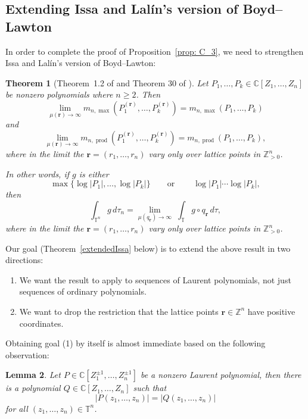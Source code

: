 \documentclass[12pt]{amsart}
\theoremstyle{plain}
\newtheorem{theorem}{Theorem}
\newtheorem{lemma}[theorem]{Lemma}
\theoremstyle{definition}
\theoremstyle{remark}
\numberwithin{theorem}{section}
\numberwithin{equation}{section} %
\newcommand{\CC}{\mathbb{C}}
\newcommand{\bZ}{{\mathbb{Z}}}
\newcommand{\bC}{{\mathbb{C}}}
\newcommand{\mb}{\mathbf}
\newcommand{\torus}{{\mathbb{T}}}
\begin{document}

\subsection{Extending Issa and Lal\'in's version of Boyd--Lawton} \label{extending_Issa}

In order to complete the proof of Proposition~\ref{prop: C_3}, we need to strengthen Issa and Lal\'in's version of Boyd--Lawton: %


\begin{theorem} [Theorem~1.2 of \cite{Issa2013} and Theorem 30 of \cite{LalinSinha}] \label{IssaThm}
Let $P_1, \dots, P_k \in \bC [Z_1, \ldots, Z_n]$ be nonzero polynomials where $n \ge 2$. Then
    \[\lim_{\mu\left( {\mb r} \right)  \to \infty} m_{n, \max}\left( P_1^{(\mb r)}, \ldots,  P_k^{(\mb r)}\right)
    =m_{n, \max}( P_1, \ldots,  P_k)
    \]
    and
    \[
    \lim_{\mu\left( {\mb r} \right)  \to \infty} m_{n, \operatorname{prod}}\left( P_1^{(\mb r)}, \ldots,  P_k^{(\mb r)}\right)
    =m_{n, \operatorname{prod}}(P_1, \ldots, P_k),
    \]
    where in the limit the $\mb r = (r_1, \ldots, r_n)$ vary only over lattice points in $\bZ^n_{>0}$.
    
        In other words, if $g$ is either
    $$
    \max \{ \log|P_1|, \ldots, \log|P_k| \}
    \qquad\text{or}\qquad
    \ \log|P_1| \cdots \log|P_k| ,
    $$
    then
    $$
\int_{\torus^n}  g \, d\tau_n= \lim_{\mu(q_\mb r)\to \infty}\;  \int_\torus g \circ q_{\mb r} \, d \tau,
$$
 where in the limit the $\mb r = (r_1, \ldots, r_n)$ vary only over lattice points in $\bZ^n_{>0}$.
\end{theorem}

Our goal (Theorem~\ref{extendedIssa} below) is to extend the above result in two directions: 
\begin{enumerate}
    \item We want the result to apply to sequences of Laurent polynomials, not just sequences of ordinary polynomials.

    \item We want to drop the restriction that the lattice points $\mb r \in \bZ^n$ have positive coordinates.
\end{enumerate} 


Obtaining goal (1) by itself is almost immediate based on the following observation:


\begin{lemma}\label{lem: PolyLaurSwap1}
    Let $P \in\CC\left[Z_1^{\pm1},\dots, Z_n^{\pm1}\right]$ be a nonzero Laurent polynomial, then there is a polynomial $Q \in \bC [Z_1, \ldots, Z_n]$
    such that
    $$
    | P(z_1, \dots, z_n) | = |Q (z_1, \dots, z_n)|
    $$
    for all $(z_1, \ldots, z_n) \in \torus^n$.
\end{lemma}
\end{document}
